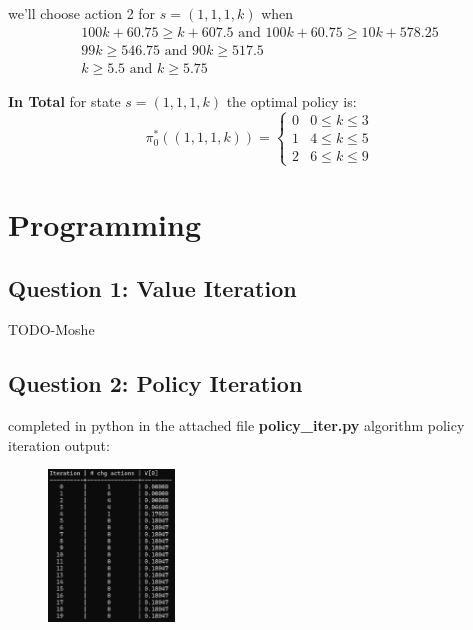 \documentclass{assignmeownt}
\begin{document}
\begin{enumerate}
we'll choose action 2 for $s=(1, 1, 1, k)$ when
\newline
\begin{equation}
    \begin{array}{cc}
        100k + 60.75 \geq k + 607.5 \text{ and } 100k + 60.75 \geq 10k + 578.25 \\
        99k \geq 546.75 \text{ and } 90k \geq 517.5 \\
        k \geq 5.5 \text{ and } k \geq 5.75
    \end{array}
\end{equation}

\textbf{In Total} for state $s=(1, 1, 1, k)$ the optimal policy is:
\begin{equation}
\pi^*_0((1, 1, 1, k)) = 
\begin{cases}
0 & 0 \leq k \leq 3 \\
1 & 4 \leq k \leq 5 \\
2 & 6 \leq k \leq 9
\end{cases}
\end{equation}
\qedsymbol{}


\end{enumerate} %

\section{Programming}

\subsection{Question 1: Value Iteration}
TODO-Moshe

\subsection{Question 2: Policy Iteration}
completed in python in the attached file \textbf{policy\_iter.py}
\newline
algorithm policy iteration output:
\begin{figure}[H]
    \centering
    \includegraphics[width=0.3\textwidth]{q2_2_iter_table_print.png}
\end{figure}
\end{document}
